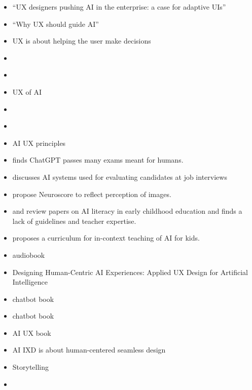 \documentclass[
  letterpaper,
  DIV=11,
  numbers=noendperiod]{scrartcl}
\begin{document}
\begin{itemize}
\item
  \citet{zimmermanUXDesignersPushing2021} ``UX designers pushing AI in
  the enterprise: a case for adaptive UIs''
\item
  \citet{WhyUXShould2021} ``Why UX should guide AI''
\item
  \citet{simonsterneUnlockingPowerDesign2023} UX is about helping the
  user make decisions
\item
  \citet{davidpasztorAIUXPrinciples2018}
\item
  \citet{andersonWaysArtificialIntelligence2020}
\item
  \citet{lennartziburskiUXAI2018} UX of AI
\item
  \citet{stephaniedonaholeHowArtificialIntelligence2021}
\item
  \citet{lexowDesigningAIUX2021}
\item
  \citet{davidpasztorAIUXPrinciples2018} AI UX principles
\item
  \citet{bubeckSparksArtificialGeneral2023} finds ChatGPT passes many
  exams meant for humans.
\item
  \citet{suenBuildingTrustAutomatic2023} discusses AI systems used for
  evaluating candidates at job interviews
\item
  \citet{wangSyntheticNeuroscoreUsingNeuroAI2020} propose Neuroscore to
  reflect perception of images.
\item
  \citet{suArtificialIntelligenceEarly2022} and
  \citet{suArtificialIntelligenceAI2023} review papers on AI literacy in
  early childhood education and finds a lack of guidelines and teacher
  expertise.
\item
  \citet{yangArtificialIntelligenceEducation2022} proposes a curriculum
  for in-context teaching of AI for kids.
\item
  \citet{ericschmidtUXAdvancedMethod2022} audiobook
\item
  \citet{akshaykoreDesigningHumanCentricAI2022} Designing Human-Centric
  AI Experiences: Applied UX Design for Artificial Intelligence
\item
  \citet{StudiesConversationalUX2018} chatbot book
\item
  \citet{tomhathawayChattingHumansUser2021} chatbot book
\item
  \citet{lewAIUXWhy2020} AI UX book
\item
  AI IXD is about human-centered seamless design
\item
  Storytelling
\item

\end{itemize}
\end{document}
